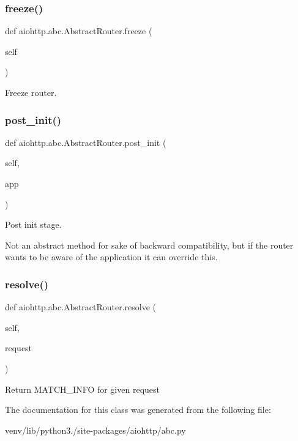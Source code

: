 \subsubsection{\texorpdfstring{freeze()}{freeze()}}
{\footnotesize\ttfamily def aiohttp.\+abc.\+Abstract\+Router.\+freeze (\begin{DoxyParamCaption}\item[{}]{self }\end{DoxyParamCaption})}

\begin{DoxyVerb}Freeze router.\end{DoxyVerb}
 \mbox{\label{classaiohttp_1_1abc_1_1_abstract_router_a4617de1de36ba4396682fe5c072e2ccc}} 
\subsubsection{\texorpdfstring{post\+\_\+init()}{post\_init()}}
{\footnotesize\ttfamily def aiohttp.\+abc.\+Abstract\+Router.\+post\+\_\+init (\begin{DoxyParamCaption}\item[{}]{self,  }\item[{}]{app }\end{DoxyParamCaption})}

\begin{DoxyVerb}Post init stage.

Not an abstract method for sake of backward compatibility,
but if the router wants to be aware of the application
it can override this.
\end{DoxyVerb}
 \mbox{\label{classaiohttp_1_1abc_1_1_abstract_router_a50eaa0cfafcd573b9d60a2a59ba0e00e}} 
\subsubsection{\texorpdfstring{resolve()}{resolve()}}
{\footnotesize\ttfamily def aiohttp.\+abc.\+Abstract\+Router.\+resolve (\begin{DoxyParamCaption}\item[{}]{self,  }\item[{}]{request }\end{DoxyParamCaption})}

\begin{DoxyVerb}Return MATCH_INFO for given request\end{DoxyVerb}
 

The documentation for this class was generated from the following file\+:\begin{DoxyCompactItemize}
\item 
venv/lib/python3./site-\/packages/aiohttp/abc.\+py\end{DoxyCompactItemize}

